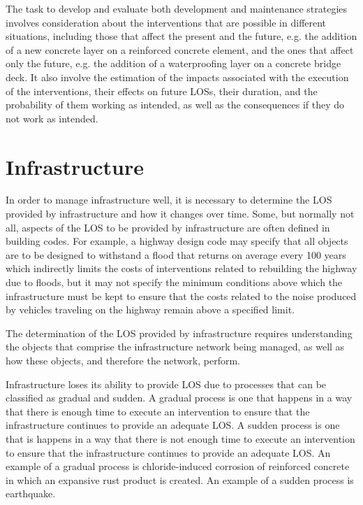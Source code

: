 The task to develop and evaluate both development and maintenance strategies involves consideration about the interventions that are possible in different situations, including those that affect the present and the future, e.g. the addition of a new concrete layer on a reinforced concrete element, and the ones that affect only the future, e.g. the addition of a waterproofing layer on a concrete bridge deck. It also involve the estimation of the impacts associated with the execution of the interventions, their effects on future LOSs, their duration, and the probability of them working as intended, as well as the consequences if they do not work as intended.

\section{Infrastructure}
In order to manage infrastructure well, it is necessary to determine the LOS provided by infrastructure and how it changes over time. Some, but normally not all, aspects of the LOS to be provided by infrastructure are often defined in building codes. For example, a highway design code may specify that all objects are to be designed to withstand a flood that returns on average every 100 years which indirectly limits the costs of interventions related to rebuilding the highway due to floods, but it may not specify the minimum conditions above which the infrastructure must be kept to ensure that the costs related to the noise produced by vehicles traveling on the highway remain above a specified limit. 

The determination of the LOS provided by infrastructure requires understanding the objects that comprise the infrastructure network being managed, as well as how these objects, and therefore the network, perform.

Infrastructure loses its ability to provide LOS due to processes that can be classified as gradual and sudden. A gradual process is one that happens in a way that there is enough time to execute an intervention to ensure that the infrastructure continues to provide an adequate LOS. A sudden process is one that is happens in a way that there is not enough time to execute an intervention to ensure that the infrastructure continues to provide an adequate LOS. An example of a gradual process is chloride-induced corrosion of reinforced concrete in which an expansive rust product is created. An example of a sudden process is earthquake.

